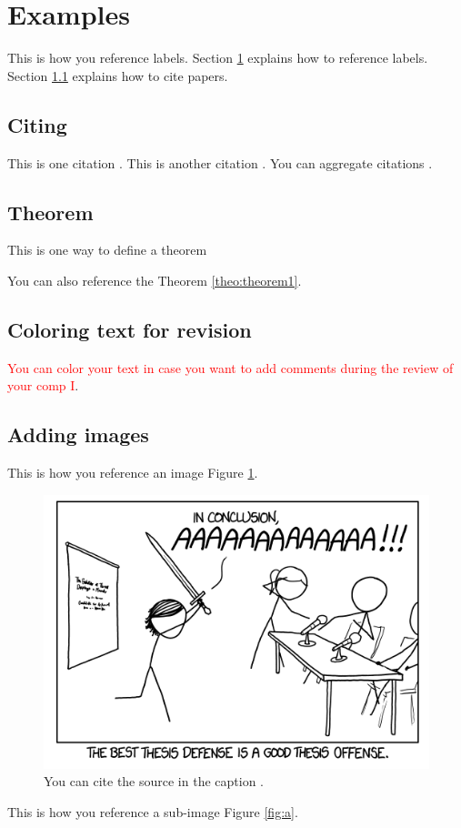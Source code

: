 \section{Examples} \label{sec:section2}

This is how you reference labels. Section \ref{sec:section2} explains how to reference labels. Section \ref{sec:citing} explains how to cite papers.

\subsection{Citing}\label{sec:citing}
This is one citation \cite{Mabuchi2012}. This is another citation \cite{HAN201687}. You can aggregate citations \cite{Mabuchi2012, HAN201687}.

\subsection{Theorem}
\begin{theorem} \label{theo:theorem1}
This is one way to define a theorem
\end{theorem}

You can also reference the Theorem \ref{theo:theorem1}.

\subsection{Coloring text for revision}
\textcolor{red}{You can color your text in case you want to add comments during the review of your comp I}.

\subsection{Adding images}
This is how you reference an image Figure \ref{fig:example_1}.

\begin{figure}[ht]
    \centering
    \includegraphics[width = 0.3\linewidth]{img/Thesis_Defence.png}
    \caption{You can cite the source in the caption \cite{xkcd}.}
    \label{fig:example_1}
\end{figure}

This is how you reference a sub-image Figure \ref{fig:a}.

